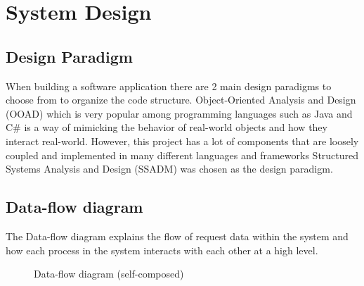 \section{System Design}

\subsection{Design Paradigm}

When building a software application there are 2 main design paradigms to choose from to organize the code structure. Object-Oriented Analysis and Design (OOAD) which is very popular among programming languages such as Java and C\# is a way of mimicking the behavior of real-world objects and how they interact real-world. However, this project has a lot of components that are loosely coupled and implemented in many different languages and frameworks Structured Systems Analysis and Design (SSADM) was chosen as the design paradigm.

\subsection{Data-flow diagram}

The Data-flow diagram explains the flow of request data within the system and how each process in the system interacts with each other at a high level.

\begin{figure}[H]
    \setlength{\fboxsep}{10pt}
    \caption{Data-flow diagram (self-composed)}
    \label{fig:data-flow}
\end{figure}

